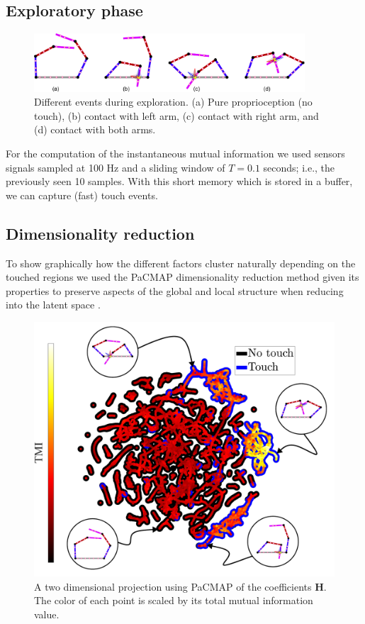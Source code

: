 \subsection{Exploratory phase}
\begin{figure}[!ht]
	\centering
	\includegraphics[width=0.9\textwidth]{planar_dual_arm_modes.pdf}
	\caption{Different events during exploration. (a) Pure proprioception (no touch), (b) contact with left arm, (c) contact with right arm, and (d) contact with both arms.}
	\label{fig:planar_dual_arm_modes}
\end{figure}
For the computation of the instantaneous mutual information we used sensors signals sampled at 100 Hz and a sliding window of $T = 0.1$ seconds; i.e., the previously seen 10 samples. With this short memory which is stored in a buffer, we can capture (fast) touch events.

\subsection{Dimensionality reduction}
To show graphically how the different factors cluster naturally depending on the touched regions we used the PaCMAP dimensionality reduction method \cite{Wang2021Understandinghowdimension} given its properties to preserve aspects of the global and local structure when reducing into the latent space \cite{Huang2022Towardscomprehensiveevaluation}.

\begin{figure}[!th]
	\centering
	\includegraphics[width=0.99\columnwidth]{fig/pacmac_with_timi_and_modes.pdf}
	\caption{A two dimensional projection using PaCMAP of the coefficients $\bm{H}$. The color of each point is scaled by its total mutual information value.}
	\label{fig:pacmac_with_timi_and_modes}
\end{figure}

